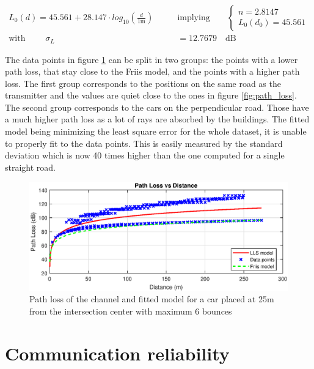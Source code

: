 \documentclass[10pt,a4paper]{ULBreport}
\begin{document}
\begin{align*}
    L_0(d) = 45.561 + 28.147 \cdot log_{10} \left(\frac{d}{1\text{m}}\right)\qquad
    &\text{implying} \qquad \left\{
    \begin{array}{l}
        n = 2.8147 \\
        L_0(d_0) = 45.561
    \end{array}
    \right.\\
    \text{with } \qquad \sigma_L &= 12.7679 \quad \text{dB}
\end{align*}

The data points in figure \ref{fig:path_loss_2} can be split in two groups: the points with a lower path loss, that stay close to the Friis model, and the points with a higher path loss. The first group corresponds to the positions on the same road as the transmitter and the values are quiet close to the ones in figure \ref{fig:path_loss}. \\
The second group corresponds to the cars on the perpendicular road. Those have a much higher path loss as a lot of rays are absorbed by the buildings. The fitted model being minimizing the least square error for the whole dataset, it is unable to properly fit to the data points. This is easily measured by the standard deviation which is now 40 times higher than the one computed for a single straight road. \\

\begin{figure}
    \centering
    \includegraphics[width=1\textwidth]{6_2.eps}
    \caption{Path loss of the channel and fitted model for a car placed at 25m from the intersection center with maximum 6 bounces}
    \label{fig:path_loss_2}
\end{figure}

\section{Communication reliability}
\end{document}
